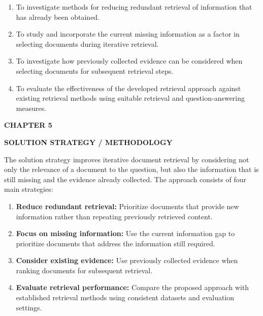 \documentclass[12pt,a4paper]{report}
\newcommand{\chaptertitle}[2]{
    \begin{center}
        {\fontsize{18}{21}\selectfont\bfseries CHAPTER #1\par}
        \vspace{0.10in}
        {\fontsize{18}{21}\selectfont\bfseries #2\par}
    \end{center}
    \vspace{0.12in}
}
\begin{document}
\begin{enumerate}[
    leftmargin=0.30in,
    itemsep=0.12in,
    parsep=0pt
]

\item
To investigate methods for reducing redundant retrieval of information that has already been obtained.

\item
To study and incorporate the current missing information as a factor in selecting documents during iterative retrieval.

\item
To investigate how previously collected evidence can be considered when selecting documents for subsequent retrieval steps.

\item
To evaluate the effectiveness of the developed retrieval approach against existing retrieval methods using suitable retrieval and question-answering measures.

\end{enumerate}

\clearpage


\setcounter{table}{0}
\renewcommand{\thetable}{5.\arabic{table}}
\setcounter{figure}{0}
\renewcommand{\thefigure}{5.\arabic{figure}}
\setcounter{chapter}{5}
\setcounter{section}{0}
\setcounter{subsection}{0}


\chaptertitle{5}{SOLUTION STRATEGY / METHODOLOGY}

\justifying

The solution strategy improves iterative document retrieval by considering not only the relevance of a document to the question, but also the information that is still missing and the evidence already collected. The approach consists of four main strategies:

\begin{enumerate}[
    leftmargin=0.30in,
    itemsep=0.14in,
    parsep=0pt
]

\item \textbf{Reduce redundant retrieval:}
Prioritize documents that provide new information rather than repeating previously retrieved content.

\item \textbf{Focus on missing information:}
Use the current information gap to prioritize documents that address the information still required.

\item \textbf{Consider existing evidence:}
Use previously collected evidence when ranking documents for subsequent retrieval.

\item \textbf{Evaluate retrieval performance:}
Compare the proposed approach with established retrieval methods using consistent datasets and evaluation settings.

\end{enumerate}
\end{document}
